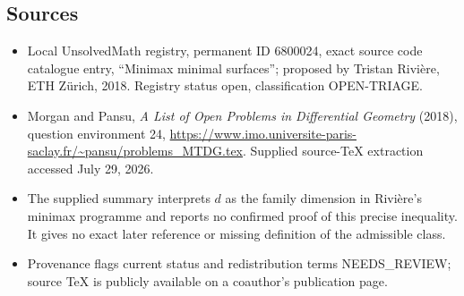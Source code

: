 \documentclass[11pt]{article}
\begin{document}
\subsection{Sources}
\begin{itemize}
\item Local UnsolvedMath registry, permanent ID 6800024, exact source code catalogue entry, ``Minimax minimal surfaces''; proposed by Tristan Rivi\`ere, ETH Z\"urich, 2018. Registry status open, classification OPEN-TRIAGE.
\item Morgan and Pansu, \emph{A List of Open Problems in Differential Geometry} (2018), question environment 24, \url{https://www.imo.universite-paris-saclay.fr/~pansu/problems_MTDG.tex}. Supplied source-TeX extraction accessed July 29, 2026.
\item The supplied summary interprets $d$ as the family dimension in Rivi\`ere's minimax programme and reports no confirmed proof of this precise inequality. It gives no exact later reference or missing definition of the admissible class.
\item Provenance flags current status and redistribution terms NEEDS\_REVIEW; source TeX is publicly available on a coauthor's publication page.
\end{itemize}
\end{document}
